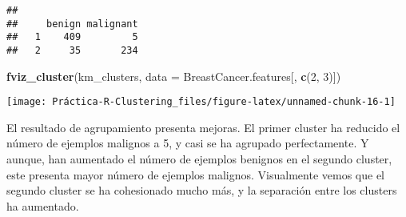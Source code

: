 \documentclass[
]{article}
\newenvironment{Shaded}{\begin{snugshade}}{\end{snugshade}}
\newcommand{\CommentTok}[1]{\textcolor[rgb]{0.56,0.35,0.01}{\textit{#1}}}
\newcommand{\DataTypeTok}[1]{\textcolor[rgb]{0.13,0.29,0.53}{#1}}
\newcommand{\DecValTok}[1]{\textcolor[rgb]{0.00,0.00,0.81}{#1}}
\newcommand{\KeywordTok}[1]{\textcolor[rgb]{0.13,0.29,0.53}{\textbf{#1}}}
\newcommand{\NormalTok}[1]{#1}
\newcommand{\OperatorTok}[1]{\textcolor[rgb]{0.81,0.36,0.00}{\textbf{#1}}}
\newcommand{\StringTok}[1]{\textcolor[rgb]{0.31,0.60,0.02}{#1}}
\begin{document}
\begin{Shaded}
\end{Shaded}

\begin{verbatim}
##    
##     benign malignant
##   1    409         5
##   2     35       234
\end{verbatim}

\begin{Shaded}
\begin{Highlighting}[]
\KeywordTok{fviz_cluster}\NormalTok{(km_clusters, }\DataTypeTok{data =}\NormalTok{ BreastCancer.features[, }\KeywordTok{c}\NormalTok{(}\DecValTok{2}\NormalTok{, }\DecValTok{3}\NormalTok{)])}
\end{Highlighting}
\end{Shaded}

\begin{center}\texttt{[image: Práctica-R-Clustering\_files/figure-latex/unnamed-chunk-16-1]} \end{center}

El resultado de agrupamiento presenta mejoras. El primer cluster ha
reducido el número de ejemplos malignos a 5, y casi se ha agrupado
perfectamente. Y aunque, han aumentado el número de ejemplos benignos en
el segundo cluster, este presenta mayor número de ejemplos malignos.
Visualmente vemos que el segundo cluster se ha cohesionado mucho más, y
la separación entre los clusters ha aumentado.
\end{document}
